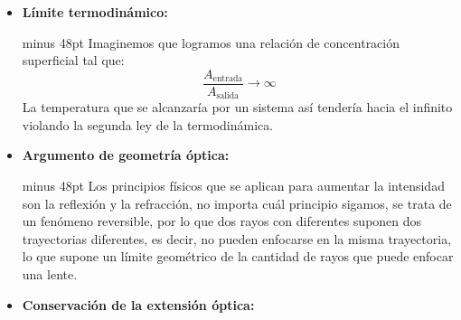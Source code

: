 		\begin{itemize}
			\item \textbf{Límite termodinámico:}\par
				\begin{rightbox}{\linewidth minus 48pt}
					Imaginemos que logramos una relación de concentración superficial tal que:
					\begin{equation*}
						\dfrac{A_{\text{entrada}}}{A_{\text{salida}}} \rightarrow \infty
					\end{equation*}
					La temperatura que se alcanzaría por un sistema así tendería hacia el infinito violando la segunda ley de la termodinámica.
				\end{rightbox}
			\item \textbf{Argumento de geometría óptica:}
				\begin{rightbox}{\linewidth minus 48pt}
					Los principios físicos que se aplican para aumentar la intensidad son la reflexión y la refracción, no importa cuál principio sigamos, se trata de un fenómeno reversible, por lo que dos rayos con diferentes suponen dos trayectorias diferentes, es decir, no pueden enfocarse en la misma trayectoria, lo que supone un límite geométrico de la cantidad de rayos que puede enfocar una lente.
				\end{rightbox}
			\item \textbf{Conservación de la extensión óptica:}
		\end{itemize}
		